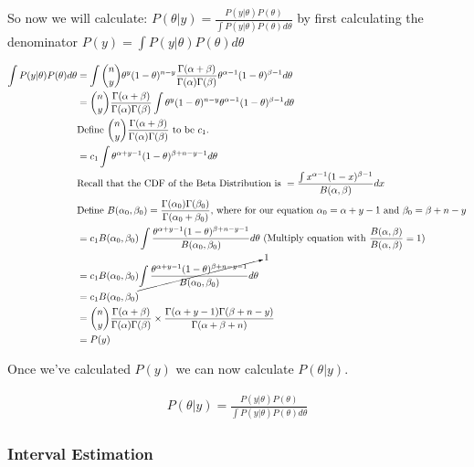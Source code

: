 \documentclass{article}
\begin{document}
\noindent So now we will calculate: $P(\theta|y) = \frac{P(y|\theta)P(\theta)}{\int P(y|\theta)P(\theta) d\theta}$ by first calculating the denominator $P(y) = \int P(y|\theta)P(\theta) d\theta$

\begin{align*}
\int P(y|\theta)P(\theta) d\theta &= \int \binom{n}{y}\theta^{y}(1-\theta)^{n-y} \frac{\Gamma(\alpha+\beta)}{\Gamma(\alpha)\Gamma(\beta)} \theta^{\alpha-1}(1-\theta)^{\beta-1} d\theta\\
&=\binom{n}{y}\frac{\Gamma(\alpha+\beta)}{\Gamma(\alpha)\Gamma(\beta)} \int \theta^{y}(1-\theta)^{n-y} \theta^{\alpha-1}(1-\theta)^{\beta-1} d\theta\\
&\text{Define } \binom{n}{y}\frac{\Gamma(\alpha+\beta)}{\Gamma(\alpha)\Gamma(\beta)} \text{ to be $c_1$}. \\
&= c_{1} \int \theta^{\alpha + y - 1}(1-\theta)^{\beta + n-y -1}  d\theta\\
&\text{Recall that the CDF of the Beta Distribution is } = \frac{\int x^{\alpha-1} (1-x)^{\beta - 1}}{B(\alpha,\beta)} dx\\
&\text{Define }B(\alpha_0,\beta_0) = \frac{\Gamma(\alpha_0)\Gamma(\beta_0)}{\Gamma(\alpha_0+\beta_0)} 
\text{, where for our equation $\alpha_0 = \alpha + y-1$ and $\beta_0 = \beta+n-y$}\\
&= c_{1}B(\alpha_0,\beta_0) \int \frac{\theta^{\alpha + y - 1}(1-\theta)^{\beta + n-y -1}}{B(\alpha_0,\beta_0)}  d\theta \text{ (Multiply equation with }\frac{B(\alpha,\beta)}{B(\alpha,\beta)} = 1)\\ 
&= c_{1}B(\alpha_0,\beta_0) \cancelto{1}{\int \frac{\theta^{\alpha + y - 1}(1-\theta)^{\beta + n-y -1}}{B(\alpha_0,\beta_0)}  d\theta}\\
&= c_{1}B(\alpha_0,\beta_0)\\
&= \binom{n}{y}\frac{\Gamma(\alpha+\beta)}{\Gamma(\alpha)\Gamma(\beta)} \times \frac{\Gamma(\alpha + y-1)\Gamma(\beta+n-y)}{\Gamma(\alpha+\beta+n)}\\
&= P(y)
\end{align*}

\newpage
Once we've calculated $P(y)$ we can now calculate $P(\theta|y)$.

\begin{align*}
P(\theta|y) = \frac{P(y|\theta)P(\theta)}{\int P(y|\theta)P(\theta) d\theta}
\end{align*}

\newpage

\subsubsection{Interval Estimation}
\end{document}
